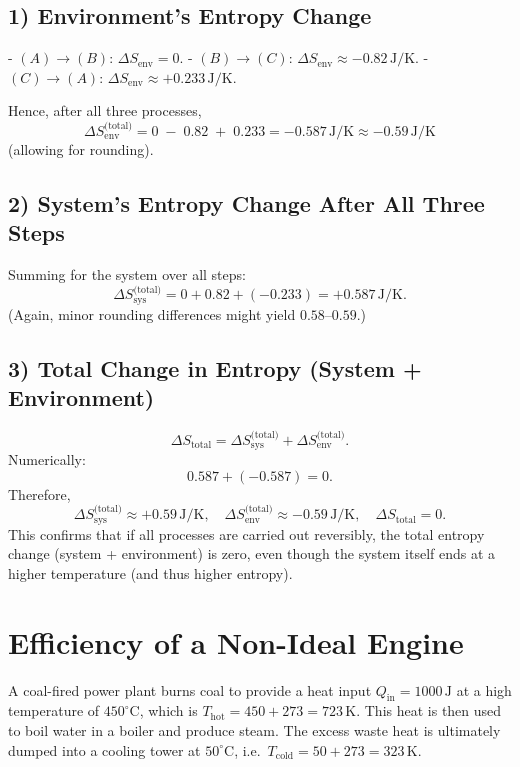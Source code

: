 \documentclass[12pt]{article}
\theoremstyle{definition} %
\theoremstyle{plain} %
\begin{document}
\subsection*{1) Environment's Entropy Change}

- \((A)\to(B)\): \(\Delta S_{\mathrm{env}}=0\).  
- \((B)\to(C)\): \(\Delta S_{\mathrm{env}}\approx -0.82\,\mathrm{J/K}\).  
- \((C)\to(A)\): \(\Delta S_{\mathrm{env}}\approx +0.233\,\mathrm{J/K}\).  

Hence, after all three processes,
\[
\Delta S_{\mathrm{env}}^{\text{(total)}} 
= 0 \;-\;0.82 \;+\;0.233 
= -0.587\,\mathrm{J/K}
\approx -0.59\,\mathrm{J/K}
\]
(allowing for rounding).

\subsection*{2) System's Entropy Change After All Three Steps}

Summing for the system over all steps:
\[
\Delta S_{\mathrm{sys}}^{\text{(total)}}
= 0 + 0.82 + (-0.233) 
= +0.587\,\mathrm{J/K}.
\]
(Again, minor rounding differences might yield \(0.58\)–\(0.59\).)

\subsection*{3) Total Change in Entropy (System + Environment)}

\[
\Delta S_{\text{total}} 
= \Delta S_{\mathrm{sys}}^{\text{(total)}}
 + \Delta S_{\mathrm{env}}^{\text{(total)}}.
\]
Numerically:
\[
0.587 + (-0.587) = 0.
\]
Therefore,
\[
\boxed{
\Delta S_{\mathrm{sys}}^{\text{(total)}} \approx +0.59\,\mathrm{J/K}, \quad
\Delta S_{\mathrm{env}}^{\text{(total)}} \approx -0.59\,\mathrm{J/K}, \quad
\Delta S_{\text{total}} = 0.
}
\]
This confirms that if all processes are carried out reversibly, the total entropy change (system + environment) is zero, even though the system itself ends at a higher temperature (and thus higher entropy).
\section*{Efficiency of a Non-Ideal Engine}

A coal-fired power plant burns coal to provide a heat input $Q_\mathrm{in} = 1000\,\mathrm{J}$ at a high temperature of $450^\circ\mathrm{C}$, which is $T_\mathrm{hot} = 450 + 273 = 723\,\mathrm{K}$. This heat is then used to boil water in a boiler and produce steam. The excess waste heat is ultimately dumped into a cooling tower at $50^\circ\mathrm{C}$, i.e.\ $T_\mathrm{cold} = 50 + 273 = 323\,\mathrm{K}$.
\end{document}
